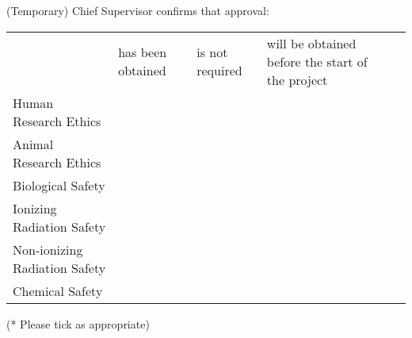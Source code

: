 \documentclass[
  11pt,
  a4paper,
  oneside
]{article}
\newcommand{\aLargeSquareToFill}{\fbox{\phantom{\rule{0.38in}{0.26in}}}}
\newcommand{\aLargeTickedSquare}{\fbox{\resizebox{0.38in}{0.26in}{$\checkmark$}} }
\begin{document}
(Temporary) Chief Supervisor confirms that approval:\\
\begin{table}[H]
\centering 
\begin{tabular}{ l >{\centering\arraybackslash}m{1in} >{\centering\arraybackslash}m{1in} >{\centering\arraybackslash}m{1in} @{}m{0pt}@{}} 
        &   \begin{minipage}[t][0.38in][t]{0.6in}
            \footnotesize * has been obtained
            \end{minipage}
                &   \begin{minipage}[t][0.38in][t]{0.9in}
                    \footnotesize * is not required
                    \end{minipage}
                        &   \begin{minipage}[t][0.38in][t]{1.0in}
                            \footnotesize * will be obtained before the start of the project
                            \end{minipage} &\\
[4.0ex]
Human Research Ethics
        & \aLargeTickedSquare
                & \aLargeSquareToFill
                        & \aLargeSquareToFill &\\ %
[4.0ex]
Animal Research Ethics
        & \aLargeTickedSquare
                & \aLargeSquareToFill
                        & \aLargeSquareToFill &\\ %
[4.0ex]
Biological Safety
        & \aLargeTickedSquare
                & \aLargeSquareToFill
                        & \aLargeSquareToFill &\\ %
[4.0ex]
Ionizing Radiation Safety
        & \aLargeTickedSquare 
                & \aLargeSquareToFill
                        & \aLargeSquareToFill &\\ %
[4.0ex]
Non-ionizing Radiation Safety
        & \aLargeSquareToFill 
                & \aLargeSquareToFill
                        & \aLargeSquareToFill &\\ %
[4.0ex]
Chemical Safety
        & \aLargeSquareToFill 
                & \aLargeSquareToFill
                        & \aLargeSquareToFill &\\ %
[4.0ex]
\end{tabular}
\end{table}
\footnotesize{(* Please tick as appropriate)}
\end{document}
